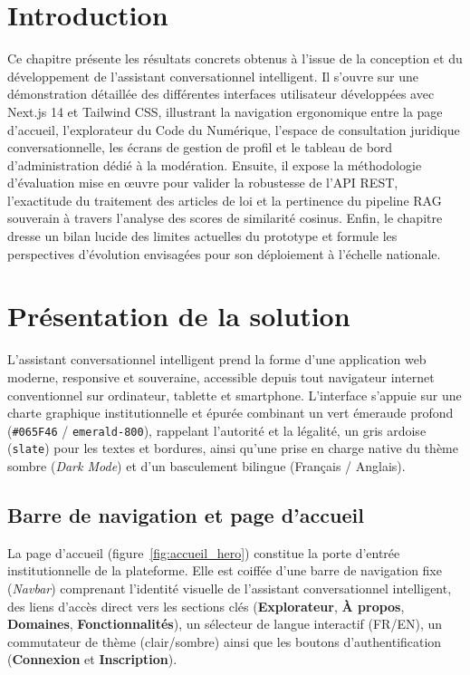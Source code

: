 \section*{Introduction}

Ce chapitre présente les résultats concrets obtenus à l'issue de la conception et du développement de l'assistant conversationnel intelligent. Il s'ouvre sur une démonstration détaillée des différentes interfaces utilisateur développées avec Next.js 14 et Tailwind CSS, illustrant la navigation ergonomique entre la page d'accueil, l'explorateur du Code du Numérique, l'espace de consultation juridique conversationnelle, les écrans de gestion de profil et le tableau de bord d'administration dédié à la modération. Ensuite, il expose la méthodologie d'évaluation mise en œuvre pour valider la robustesse de l'API REST, l'exactitude du traitement des articles de loi et la pertinence du pipeline RAG souverain à travers l'analyse des scores de similarité cosinus. Enfin, le chapitre dresse un bilan lucide des limites actuelles du prototype et formule les perspectives d'évolution envisagées pour son déploiement à l'échelle nationale.

\section{Présentation de la solution}

L'assistant conversationnel intelligent prend la forme d'une application web moderne, responsive et souveraine, accessible depuis tout navigateur internet conventionnel sur ordinateur, tablette et smartphone. L'interface s'appuie sur une charte graphique institutionnelle et épurée combinant un vert émeraude profond (\texttt{\#065F46} / \texttt{emerald-800}), rappelant l'autorité et la légalité, un gris ardoise (\texttt{slate}) pour les textes et bordures, ainsi qu'une prise en charge native du thème sombre (\textit{Dark Mode}) et d'un basculement bilingue (Français / Anglais).

\subsection{Barre de navigation et page d'accueil}

La page d'accueil (figure~\ref{fig:accueil_hero}) constitue la porte d'entrée institutionnelle de la plateforme. Elle est coiffée d'une barre de navigation fixe (\textit{Navbar}) comprenant l'identité visuelle de l'assistant conversationnel intelligent, des liens d'accès direct vers les sections clés (\textbf{Explorateur}, \textbf{À propos}, \textbf{Domaines}, \textbf{Fonctionnalités}), un sélecteur de langue interactif (FR/EN), un commutateur de thème (clair/sombre) ainsi que les boutons d'authentification (\textbf{Connexion} et \textbf{Inscription}).

